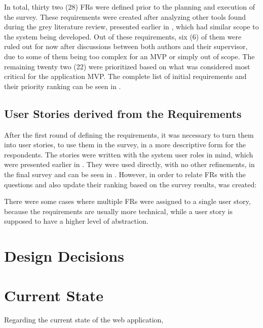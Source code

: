 In total, thirty two (28) \acp{FR} were defined prior to the planning and execution of the survey. These requirements were created after analyzing other tools found during the grey literature review, presented earlier in , which had similar scope to the system being developed. Out of these requirements, six (6) of them were ruled out for now after discussions between both authors and their supervisor, due to some of them being too complex for an \ac{MVP} or simply out of scope. The remaining twenty two (22) were prioritized based on what was considered most critical for the application \ac{MVP}. The complete list of initial requirements and their priority ranking can be seen in .



\subsection{User Stories derived from the Requirements}\label{ext:user-stories}

After the first round of defining the requirements, it was necessary to turn them into user stories, to use them in the survey, in a more descriptive form for the respondents. The stories were written with the system user roles in mind, which were presented earlier in . They were used directly, with no other refinements, in the final survey and can be seen in . However, in order to relate \acp{FR} with the questions and also update their ranking based on the survey results,  was created:



There were some cases where multiple \acp{FR} were assigned to a single user story, because the requirements are usually more technical, while a user story is supposed to have a higher level of abstraction.


\section{Design Decisions}\label{ext:design-decisions}



\section{Current State}\label{ext:current-state}

Regarding the current state of the web application,